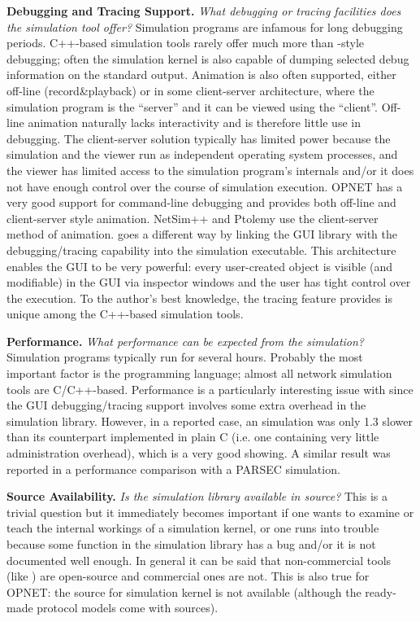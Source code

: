\textbf{Debugging and Tracing Support.} \textit{What debugging or tracing
facilities does the simulation tool offer?} Simulation programs
are infamous for long debugging periods. C++-based simulation
tools rarely offer much more than -style debugging; often
the simulation kernel is also capable of dumping selected debug
information on the standard output. Animation is also often supported,
either off-line (record\&playback) or in some client-server architecture,
where the simulation program is the ``server'' and
it can be viewed using the ``client''. Off-line animation
naturally lacks interactivity and is therefore little use in
debugging. The client-server solution typically has limited power
because the simulation and the viewer run as independent operating
system processes, and the viewer has limited access to the simulation
program's internals and/or it does not have enough control over
the course of simulation execution. OPNET has a very good support
for command-line debugging and provides both off-line and client-server
style animation. NetSim++ and Ptolemy use the client-server method
of animation. {\opp} goes a different way by linking the GUI
library with the debugging/tracing capability into the simulation
executable. This architecture enables the GUI to be very powerful:
every user-created object is visible (and modifiable) in the
GUI via inspector windows and the user has tight control over
the execution. To the author's best knowledge, the tracing feature
{\opp} provides is unique among the C++-based simulation tools.


\textbf{Performance.} \textit{What performance can be expected from the
simulation?} Simulation programs typically run for several hours.
Probably the most important factor is the programming language;
almost all network simulation tools are C/C++-based. Performance
is a particularly interesting issue with {\opp} since the GUI
debugging/tracing support involves some extra overhead in the
simulation library. However, in a reported case, an {\opp} simulation
was only 1.3 slower than its counterpart implemented in plain
C (i.e. one containing very little administration overhead),
which is a very good showing. A similar result was reported in
a performance comparison with a PARSEC simulation.


\textbf{Source Availability.} \textit{Is the simulation library available
in source?} This is a trivial question but it immediately becomes
important if one wants to examine or teach the internal workings
of a simulation kernel, or one runs into trouble because some
function in the simulation library has a bug and/or it is not
documented well enough. In general it can be said that non-commercial
tools (like {\opp}) are open-source and commercial ones are
not. This is also true for OPNET: the source for simulation kernel
is not available (although the ready-made protocol models come
with sources).


